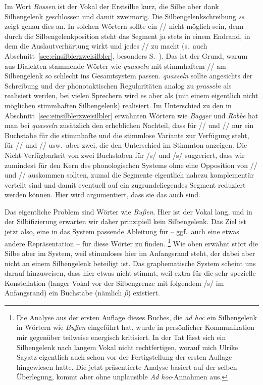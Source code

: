 Im Wort \textit{Bussen} \textipa{[bU\Sgel{s}@n]} ist der Vokal der Erstsilbe kurz, die Silbe aber dank Silbengelenk geschlossen und damit zweimorig.
Die Silbengelenkschreibung \textit{ss} zeigt genau dies an.
In solchen Wörtern sollte ein // nicht möglich sein, denn durch die Silbengelenkposition steht das Segment ja stets in einem Endrand, in dem die Auslautverhärtung wirkt und jedes // zu \textipa{[s]} macht (s.\ auch Abschnitt~\ref{sec:einsilblerzweisilbler}, besonders S.~\pageref{abs:silbengelenkstimmlos}).
Das ist der Grund, warum aus Dialekten stammende Wörter wie \textit{quasseln} mit stimmhaftem // am Silbengelenk so schlecht ins Gesamtsystem passen.
\textit{quasseln} sollte angesichts der Schreibung und der phonotaktischen Regularitäten analog zu \textit{prasseln}  als  realisiert werden, bei vielen Sprechern wird es aber als  (mit einem eigentlich nicht möglichen stimmhaften Silbengelenk) realisiert.
Im Unterschied zu den in Abschnitt~\ref{sec:einsilblerzweisilbler} erwähnten Wörtern wie \textit{Bagger} und \textit{Robbe} hat man bei \textit{quasseln} zusätzlich den erheblichen Nachteil, dass für // und // nur ein Buchstabe für die stimmhafte und die stimmlose Variante zur Verfügung steht, für // und // usw.\ aber zwei, die den Unterschied im Stimmton anzeigen.
Die Nicht-Verfügbarkeit von zwei Buchstaben für /s/ und /s/ suggeriert, dass wir zumindest für den Kern des phonologischen Systems ohne eine Opposition von // und // auskommen sollten, zumal die Segmente eigentlich nahezu komplementär verteilt sind und damit eventuell auf ein zugrundeliegendes Segment reduziert werden können.
Hier wird argumentiert, dass sie das auch sind.

Das eigentliche Problem sind Wörter wie \textit{Bußen}.
Hier ist der Vokal lang, und in der Silbifizierung \textipa{[bu:.s@n]} erwarten wir daher prinzipiell kein Silbengelenk.
Das Ziel ist jetzt also, eine in das System passende Ableitung für \textipa{[bu:.s@n]} -- ggf.\ auch eine etwas andere Repräsentation -- für diese Wörter zu finden.%
\footnote{Die Analyse aus der ersten Auflage dieses Buches, die \textit{ad hoc} ein Silbengelenk in Wörtern wie \textit{Bußen} eingeführt hat, wurde in persönlicher Kommunikation mir gegenüber teilweise energisch kritisiert.
In der Tat lässt sich ein Silbengelenk nach langem Vokal nicht rechtfertigen, worauf mich Ulrike Sayatz eigentlich auch schon vor der Fertigstellung der ersten Auflage hingewiesen hatte.
Die jetzt präsentierte Analyse basiert auf der selben Überlegung, kommt aber ohne unplausible \textit{Ad hoc}-Annahmen aus.}
Wie oben erwähnt stört die Silbe \textipa{[s@n]} aber im System, weil stimmloses \textipa{[s]} hier im Anfangsrand steht, der dabei aber nicht an einem Silbengelenk beteiligt ist.
Das graphematische System scheint uns darauf hinzuweisen, dass hier etwas nicht stimmt, weil extra für die sehr spezielle Konstellation (langer Vokal vor der Silbengrenze mit folgendem /s/ im Anfangsrand) ein Buchstabe (nämlich \textit{ß}) existiert.

